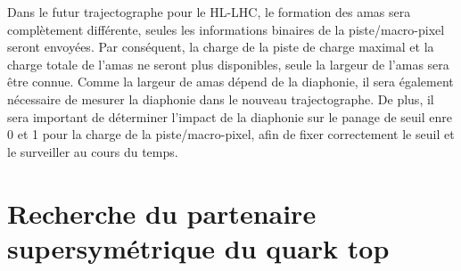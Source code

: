 
Dans le futur trajectographe pour le HL-LHC, le formation des amas sera complètement différente, seules les informations binaires de la piste/macro-pixel seront envoyées. Par conséquent, la charge de la piste de charge maximal et la charge totale de l'amas ne seront plus disponibles, seule la largeur de l'amas sera être connue. Comme la largeur de amas dépend de la diaphonie, il sera également nécessaire de mesurer la diaphonie dans le nouveau trajectographe. De plus, il sera important de déterminer l'impact de la diaphonie sur le panage de seuil enre 0 et 1 pour la charge de la piste/macro-pixel, afin de fixer correctement le seuil et le surveiller au cours du temps.

\section{Recherche du partenaire supersymétrique du quark top}


